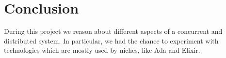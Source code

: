 \section{Conclusion}

During this project we reason about different
aspects of a concurrent and distributed system.
In particular, we had the chance to experiment
with technologies which are mostly used by
niches, like Ada and Elixir.








